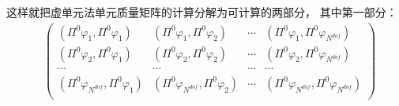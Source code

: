 这样就把虚单元法单元质量矩阵的计算分解为可计算的两部分， 其中第一部分：\\
\begin{equation*}
\begin{aligned}
&\begin{pmatrix}
(\Pi^0\varphi_1, \Pi^0\varphi_1) & (\Pi^0\varphi_1, \Pi^0\varphi_2) & \cdots & (\Pi^0\varphi_1, \Pi^0\varphi_{N^{dof}})\\
(\Pi^0\varphi_2, \Pi^0\varphi_1) & (\Pi^0\varphi_2, \Pi^0\varphi_2) & \cdots & (\Pi^0\varphi_2, \Pi^0\varphi_{N^{dof}})\\
\cdots & \cdots & \cdots & \cdots \\
(\Pi^0\varphi_{N^{dof}}, \Pi^0\varphi_1) & (\Pi^0\varphi_{N^{dof}}, \Pi^0\varphi_2) & \cdots & (\Pi^0\varphi_{N^{dof}}, \Pi^0\varphi_{N^{dof}})\\
\end{pmatrix}\\
\end{aligned}
\end{equation*}
